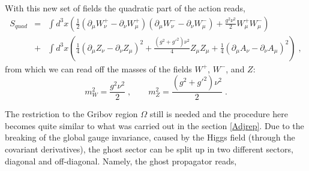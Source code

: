 With this new set of fields the quadratic part of the action reads,
\begin{eqnarray}
S_{quad} &=&  \int d^3 x   \left( \frac{1}{2} (\partial_\mu W^+_\nu - \partial_\nu W^+_\mu)(\partial_\mu W^-_\nu - \partial_\nu W^-_\mu)  + \frac{g^2\nu^2}{2}W^+_\mu W^-_\mu   \right) 
\nonumber \\
&+& \int d^3x  \left(  \frac{1}{4} (\partial_\mu Z_\nu - \partial_\nu Z_\mu)^2  + \frac{(g^2+g'^2)\nu^2}{4}Z_\mu Z _\mu  +    \frac{1}{4} (\partial_\mu A_\nu - \partial_\nu A_\mu)^2  \right)  \;,
\label{qd}
\end{eqnarray}
from which we can read off the masses of the fields $W^+$, $W^-$, and $Z$:
\begin{equation}
m^2_W = \frac{g^2\nu^2}{2} \;, \qquad m^2_Z =  \frac{(g^2+g'^2)\nu^2}{2}  \;. \label{ms}
\end{equation}

The restriction to the Gribov region $\Omega$ still is needed and the procedure here becomes quite similar to what was carried out in the section \ref{Adjrep}. Due to the breaking of the global gauge invariance, caused by the Higgs field (through the covariant derivatives), the ghost sector can be split up in two different sectors, diagonal and off-diagonal. Namely, the ghost propagator reads,



